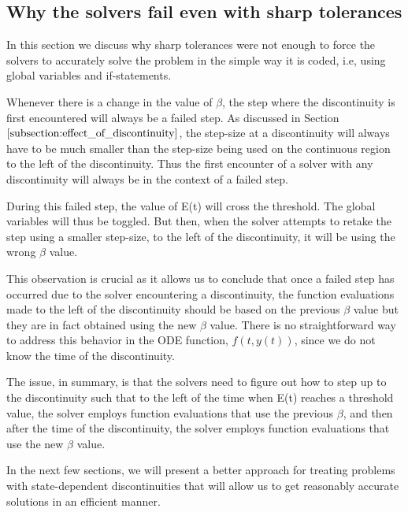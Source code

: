 \subsection{Why the solvers fail even with sharp tolerances}
\label{subsection:state_sharp_tol_failed}
In this section we discuss why sharp tolerances were not enough to force the solvers to accurately solve the problem in the simple way it is coded, i.e, using global variables and if-statements. 

Whenever there is a change in the value of $\beta$, the step where the discontinuity is first encountered will always be a failed step. As discussed in Section $\ref{subsection:effect_of_discontinuity}$, the step-size at a discontinuity will always have to be much smaller than the step-size being used on the continuous region to the left of the discontinuity. Thus the first encounter of a solver with any discontinuity will always be in the context of a failed step.

During this failed step, the value of E(t) will cross the threshold. The global variables will thus be toggled. But then, when the solver attempts to retake the step using a smaller step-size, to the left of the discontinuity, it will be using the wrong $\beta$ value. 

This observation is crucial as it allows us to conclude that once a failed step has occurred due to the solver encountering a discontinuity, the function evaluations made to the left of the discontinuity should be based on the previous $\beta$ value but they are in fact obtained using the new $\beta$ value. There is no straightforward way to address this behavior in the ODE function, $f(t, y(t))$, since we do not know the time of the discontinuity. 

The issue, in summary, is that the solvers need to figure out how to step up to the discontinuity such that to the left of the time when E(t) reaches a threshold value, the solver employs function evaluations that use the previous $\beta$, and then after the time of the discontinuity, the solver employs function evaluations that use the new $\beta$ value.

In the next few sections, we will present a better approach for treating problems with state-dependent discontinuities that will allow us to get reasonably accurate solutions in an efficient manner.

